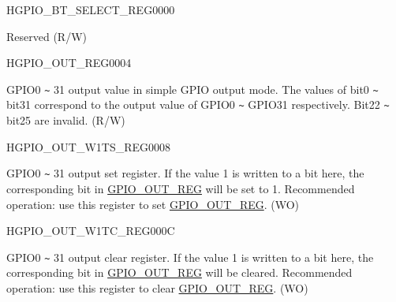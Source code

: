 \begin{register}{H}{GPIO\_BT\_SELECT\_REG}{\hexprefix{}0000}\label{regdesc:GPIOBTSELECTREG}
%
\regnewline%
\begin{regdesc}\begin{reglist}
\label{fielddesc:GPIOBTSEL}\item [GPIO\_BT\_SEL] Reserved (R/W)
\end{reglist}\end{regdesc}
\end{register}


\begin{register}{H}{GPIO\_OUT\_REG}{\hexprefix{}0004}\label{regdesc:GPIOOUTREG}
%
\regnewline%
\begin{regdesc}\begin{reglist}
\label{fielddesc:GPIOOUTDATAORIG}\item [GPIO\_OUT\_DATA\_ORIG] GPIO0 \verb+~+ 31 output value in simple GPIO output mode. The values of bit0 \verb+~+ bit31 correspond to the output value of GPIO0 \verb+~+ GPIO31 respectively. Bit22 \verb+~+ bit25 are invalid. (R/W)
\end{reglist}\end{regdesc}
\end{register}


\begin{register}{H}{GPIO\_OUT\_W1TS\_REG}{\hexprefix{}0008}\label{regdesc:GPIOOUTW1TSREG}
%
\regnewline%
\begin{regdesc}\begin{reglist}
\label{fielddesc:GPIOOUTW1TS}\item [GPIO\_OUT\_W1TS] GPIO0 \verb+~+ 31 output set register. If the value 1 is written to a bit here, the corresponding bit in \hyperref[regdesc:GPIOOUTREG]{GPIO\_OUT\_REG} will be set to 1. Recommended operation: use this register to set \hyperref[regdesc:GPIOOUTREG]{GPIO\_OUT\_REG}. (WO)
\end{reglist}\end{regdesc}
\end{register}


\begin{register}{H}{GPIO\_OUT\_W1TC\_REG}{\hexprefix{}000C}\label{regdesc:GPIOOUTW1TCREG}
%
\regnewline%
\begin{regdesc}\begin{reglist}
\label{fielddesc:GPIOOUTW1TC}\item [GPIO\_OUT\_W1TC] GPIO0 \verb+~+ 31 output clear register. If the value 1 is written to a bit here, the corresponding bit in \hyperref[regdesc:GPIOOUTREG]{GPIO\_OUT\_REG} will be cleared. Recommended operation: use this register to clear \hyperref[regdesc:GPIOOUTREG]{GPIO\_OUT\_REG}. (WO)
\end{reglist}\end{regdesc}
\end{register}


